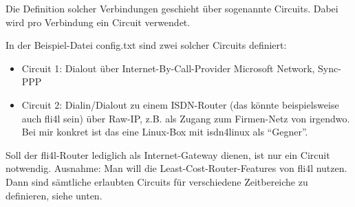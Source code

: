 Die Definition solcher Verbindungen geschieht über sogenannte
Circuits.  Dabei wird pro Verbindung ein Circuit verwendet.

In der Beispiel-Datei config.txt sind zwei solcher Circuits definiert:

\begin{itemize}
\item Circuit 1: Dialout über Internet-By-Call-Provider Microsoft Network, Sync-PPP
  
\item Circuit 2: Dialin/Dialout zu einem ISDN-Router (das könnte beispielsweise 
  auch fli4l sein)
  über Raw-IP, z.B. als Zugang zum Firmen-Netz von irgendwo. Bei
  mir konkret ist das eine Linux-Box mit isdn4linux als ``Gegner''.

\end{itemize}

Soll der fli4l-Router lediglich als Internet-Gateway dienen, ist nur
ein Circuit notwendig. Ausnahme: Man will die
Least-Cost-Router-Features von fli4l nutzen. Dann sind sämtliche
erlaubten Circuits für verschiedene Zeitbereiche zu definieren, siehe
unten.

